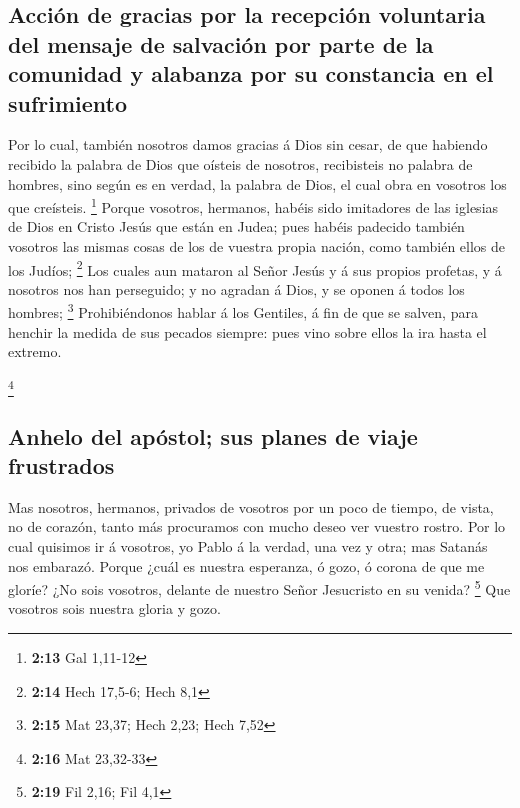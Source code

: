 \hypertarget{acciuxf3n-de-gracias-por-la-recepciuxf3n-voluntaria-del-mensaje-de-salvaciuxf3n-por-parte-de-la-comunidad-y-alabanza-por-su-constancia-en-el-sufrimiento}{%
\subsection{Acción de gracias por la recepción voluntaria del mensaje de
salvación por parte de la comunidad y alabanza por su constancia en el
sufrimiento}\label{acciuxf3n-de-gracias-por-la-recepciuxf3n-voluntaria-del-mensaje-de-salvaciuxf3n-por-parte-de-la-comunidad-y-alabanza-por-su-constancia-en-el-sufrimiento}}

 Por lo cual, también nosotros damos gracias á Dios sin
cesar, de que habiendo recibido la palabra de Dios que oísteis de
nosotros, recibisteis no palabra de hombres, sino según es en verdad, la
palabra de Dios, el cual obra en vosotros los que creísteis. \footnote{\textbf{2:13}
  Gal 1,11-12}  Porque vosotros, hermanos, habéis sido
imitadores de las iglesias de Dios en Cristo Jesús que están en Judea;
pues habéis padecido también vosotros las mismas cosas de los de vuestra
propia nación, como también ellos de los Judíos; \footnote{\textbf{2:14}
  Hech 17,5-6; Hech 8,1}  Los cuales aun mataron al Señor
Jesús y á sus propios profetas, y á nosotros nos han perseguido; y no
agradan á Dios, y se oponen á todos los hombres; \footnote{\textbf{2:15}
  Mat 23,37; Hech 2,23; Hech 7,52}  Prohibiéndonos hablar á
los Gentiles, á fin de que se salven, para henchir la medida de sus
pecados siempre: pues vino sobre ellos la ira hasta el extremo.

\footnote{\textbf{2:16} Mat 23,32-33}

\hypertarget{anhelo-del-apuxf3stol-sus-planes-de-viaje-frustrados}{%
\subsection{Anhelo del apóstol; sus planes de viaje
frustrados}\label{anhelo-del-apuxf3stol-sus-planes-de-viaje-frustrados}}

 Mas nosotros, hermanos, privados de vosotros por un poco
de tiempo, de vista, no de corazón, tanto más procuramos con mucho deseo
ver vuestro rostro.  Por lo cual quisimos ir á vosotros, yo
Pablo á la verdad, una vez y otra; mas Satanás nos embarazó.
 Porque ¿cuál es nuestra esperanza, ó gozo, ó corona de que
me gloríe? ¿No sois vosotros, delante de nuestro Señor Jesucristo en su
venida? \footnote{\textbf{2:19} Fil 2,16; Fil 4,1}  Que
vosotros sois nuestra gloria y gozo.

